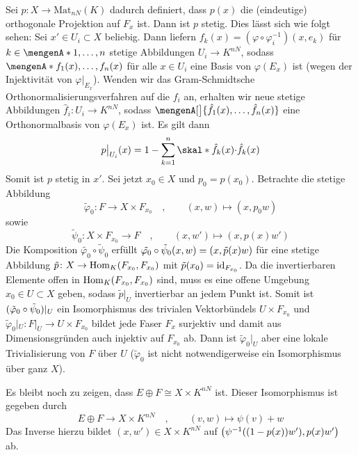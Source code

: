 \begin{beweis}
Sei $p \colon X \to \mathrm{Mat}_{nN}(K)$ dadurch definiert, dass $p(x)$ die (eindeutige) orthogonale Projektion auf $F_x$ ist. Dann ist $p$ stetig. Dies lässt sich wie 
folgt sehen: Sei $x' \in U_i \subset X$ beliebig. Dann liefern $f_k(x)=(\varphi \circ \varphi_i ^{-1})(x,e_k)$ für $k \in \set{1, \ldots ,n}$ stetige Abbildungen 
$U_i \to K^{nN}$, sodass $\set{f_1(x), \ldots , f_n(x)}$ für alle $x \in U_i$ eine Basis von $\varphi(E_x)$ ist (wegen der Injektivität von $\varphi|_{E_x}$). Wenden wir das
Gram-Schmidtsche Orthonormalisierungsverfahren auf die $f_i$ an, erhalten wir neue stetige Abbildungen $\hat{f}_i \colon U_i \to K^{nN}$, sodass 
$\mengenA[\big]{\hat{f}_1(x), \ldots , \hat{f}_n(x)}$ eine Orthonormalbasis von $\varphi(E_x)$ ist. Es gilt dann
\[
	p\big|_{U_i}(x) = 1 - \sum_{k=1}^{n} \skal*{\hat{f}_k(x)}{\cdot } \hat{f}_k(x)
\]
Somit ist $p$ stetig in $x'$. Sei jetzt $x_0 \in X$ und $p_0=p(x_0)$. Betrachte die stetige Abbildung
\[
	\tilde{\varphi}_0 \colon F \longrightarrow X \times F_{x_0} \quad , \qquad (x,w) \longmapsto (x,p_0 w)
\]
sowie
\[
	\tilde{\psi}_0 \colon X \times F_{x_0} \longrightarrow F \quad ,\qquad (x,w') \longmapsto (x,p(x) w')
\] 
Die Komposition $\tilde{\varphi_0} \circ \tilde{\psi}_0$ erfüllt $\tilde{\varphi_0} \circ \tilde{\psi}_0(x,w) = \enbrace*{x,\tilde{p}(x) w}$ für eine stetige Abbildung 
$\tilde{p} \colon X \to \Hom_K(F_{x_0}, F_{x_0})$ mit $\tilde{p}(x_0)=\id_{F_{x_0}}$. Da die invertierbaren Elemente offen in $\Hom_K(F_{x_0},F_{x_0})$ sind, muss es eine 
offene Umgebung $x_0 \in U \subset X$ geben, sodass $\tilde{p}|_U$ invertierbar an jedem Punkt ist. Somit ist $\enbrace{\tilde{\varphi}_0 \circ \tilde{\psi}_0}|_U$ ein 
Isomorphismus des trivialen Vektorbündels $U \times F_{x_0}$ und $\tilde{\varphi}_0|_U \colon F|_U \to U \times F_{x_0}$ bildet jede Faser $F_x$ surjektiv und damit aus 
Dimensionsgründen auch injektiv auf $F_{x_0}$ ab. Dann ist $\tilde{\varphi}_0|_U$ aber eine lokale Trivialisierung von $F$ über $U$ ($\tilde{\varphi}_0$ ist nicht 
notwendigerweise ein Isomorphismus über ganz $X$).

Es bleibt noch zu zeigen, dass $E \oplus F \cong X \times K^{nN}$ ist. Dieser Isomorphismus ist gegeben durch 
\[
	E \oplus F \longrightarrow X \times K^{nN} \quad , \qquad (v,w) \longmapsto \psi(v) + w
\]
Das Inverse hierzu bildet $(x,w') \in X \times K^{nN}$ auf $\enbrace*{\psi ^{-1} \enbrace*{ (1- p(x)) w'}, p(x)w'}$ ab. 
\end{beweis}



